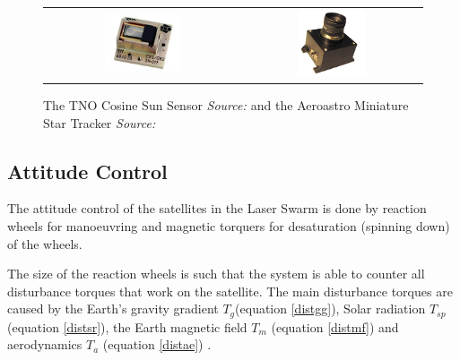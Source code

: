 \begin{figure} [ht!]
\centering
\begin{tabular}{c c}
\includegraphics[width = 0.4\textwidth]{chapters/img/CoSS.jpg} & \includegraphics[width = 0.4\textwidth]{chapters/img/MSTracker.png}
\end{tabular}
\caption[Sun sensor and star tracker]{The TNO Cosine Sun Sensor \emph{Source: \cite{tnoweb}} and the Aeroastro Miniature Star Tracker \emph{Source: \cite{aeromst}}}
\label{fig:sunstar}
\end{figure}

\subsection{Attitude Control}
\label{ss:emDDacs}
The attitude control of the satellites in the Laser Swarm is done by reaction wheels for manoeuvring and magnetic torquers for desaturation (spinning down) of the wheels. 

The size of the reaction wheels is such that the system is able to counter all disturbance torques that work on the satellite. The main disturbance torques are caused by the Earth's gravity gradient $T_g$(equation \ref{distgg}), Solar radiation $T_{sp}$ (equation \ref{distsr}), the Earth magnetic field $T_m$ (equation \ref{distmf}) and aerodynamics $T_a$ (equation \ref{distae}) \cite{larson}.

